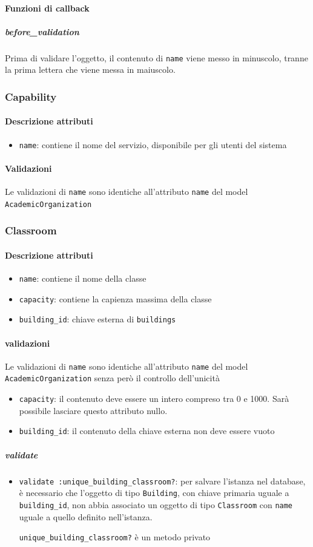 \documentclass[11pt,a4paper]{article}
\begin{document}
\paragraph{Funzioni di callback}
\subparagraph{before\_validation}
Prima di validare l'oggetto, il contenuto di \verb|name| viene messo in minuscolo, tranne la prima lettera che viene messa in maiuscolo.
\subsubsection{Capability}
\paragraph{Descrizione attributi}
\begin{itemize}
 \item \verb|name|: contiene il nome del servizio, disponibile per gli utenti del sistema
\end{itemize}
\paragraph{Validazioni}
Le validazioni di \verb|name| sono identiche all'attributo \verb|name| del model \verb|AcademicOrganization|
\subsubsection{Classroom}
\paragraph{Descrizione attributi}
\begin{itemize}
 \item \verb|name|: contiene il nome della classe
 \item \verb|capacity|: contiene la capienza massima della classe
 \item \verb|building_id|: chiave esterna di \verb|buildings|	
\end{itemize}
\paragraph{validazioni}
Le validazioni di \verb|name| sono identiche all'attributo \verb|name| del model \verb|AcademicOrganization| senza però il controllo dell'unicità
\begin{itemize}
\item \verb|capacity|: il contenuto deve essere un intero compreso tra 0 e 1000. Sarà possibile lasciare questo attributo nullo.
\item \verb|building_id|: il contenuto della chiave esterna non deve essere vuoto 
\end{itemize}
\subparagraph{validate}
\begin{itemize}
 \item \verb|validate :unique_building_classroom?|: per salvare l'istanza nel database, è necessario che l'oggetto di tipo \verb|Building|, con chiave primaria uguale a \verb|building_id|, non abbia associato un oggetto di tipo \verb|Classroom| con \verb|name| uguale a quello definito nell'istanza.


\verb|unique_building_classroom?| è un metodo privato
\end{itemize}
\end{document}
